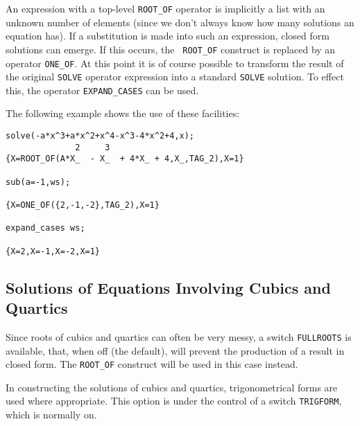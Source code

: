 \hypertarget{operator:ONE_OF}{}
\hypertarget{operator:EXPAND_CASES}{}
An expression with a top-level {\tt ROOT\_OF} operator is implicitly a
list with an unknown number of elements (since we don't always know how
many solutions an equation has).  If a substitution is made into such an
expression, closed form solutions can emerge.  If this occurs, the {\tt
ROOT\_OF} construct is replaced by an operator {\tt ONE\_OF}.
At this point it is of course possible to transform the result of the
original {\tt SOLVE} operator expression into a standard {\tt SOLVE}
solution.  To effect this, the operator {\tt EXPAND\_CASES}
 can be used.

The following example shows the use of these facilities:
\begin{verbatim}
solve(-a*x^3+a*x^2+x^4-x^3-4*x^2+4,x);
              2     3
{X=ROOT_OF(A*X_  - X_  + 4*X_ + 4,X_,TAG_2),X=1}

sub(a=-1,ws);

{X=ONE_OF({2,-1,-2},TAG_2),X=1}

expand_cases ws;

{X=2,X=-1,X=-2,X=1}
\end{verbatim}

\subsection{Solutions of Equations Involving Cubics and Quartics}
\hypertarget{switch:FULLROOTS}{}
\hypertarget{switch:TRIGFORM}{}

Since roots of cubics and quartics can often be very messy, a switch
{\tt FULLROOTS} is available, that, when off (the
default), will prevent the production of a result in closed form.  The
{\tt ROOT\_OF} construct will be used in this case instead.

In constructing the solutions of cubics and quartics, trigonometrical
forms are used where appropriate.  This option is under the control of a
switch {\tt TRIGFORM}, which is normally on.

